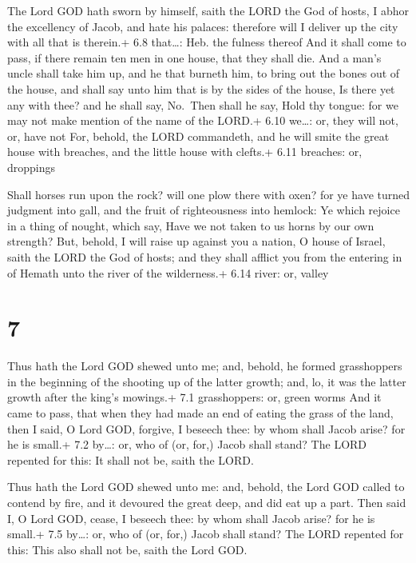  The Lord GOD hath sworn by himself, saith the LORD the God
of hosts, I abhor the excellency of Jacob, and hate his palaces:
therefore will I deliver up the city with all that is therein.+ 6.8
that\ldots: Heb. the fulness thereof  And it shall come to
pass, if there remain ten men in one house, that they shall die.
 And a man's uncle shall take him up, and he that burneth
him, to bring out the bones out of the house, and shall say unto him
that is by the sides of the house, Is there yet any with thee? and he
shall say, No.~Then shall he say, Hold thy tongue: for we may not make
mention of the name of the LORD.+ 6.10 we\ldots: or, they will not, or,
have not  For, behold, the LORD commandeth, and he will
smite the great house with breaches, and the little house with clefts.+
6.11 breaches: or, droppings

 Shall horses run upon the rock? will one plow there with
oxen? for ye have turned judgment into gall, and the fruit of
righteousness into hemlock:  Ye which rejoice in a thing of
nought, which say, Have we not taken to us horns by our own strength?
 But, behold, I will raise up against you a nation, O house
of Israel, saith the LORD the God of hosts; and they shall afflict you
from the entering in of Hemath unto the river of the wilderness.+ 6.14
river: or, valley

\hypertarget{section-6}{%
\section{7}\label{section-6}}

 Thus hath the Lord GOD shewed unto me; and, behold, he
formed grasshoppers in the beginning of the shooting up of the latter
growth; and, lo, it was the latter growth after the king's mowings.+ 7.1
grasshoppers: or, green worms  And it came to pass, that
when they had made an end of eating the grass of the land, then I said,
O Lord GOD, forgive, I beseech thee: by whom shall Jacob arise? for he
is small.+ 7.2 by\ldots: or, who of (or, for,) Jacob shall stand?
 The LORD repented for this: It shall not be, saith the
LORD.

 Thus hath the Lord GOD shewed unto me: and, behold, the
Lord GOD called to contend by fire, and it devoured the great deep, and
did eat up a part.  Then said I, O Lord GOD, cease, I
beseech thee: by whom shall Jacob arise? for he is small.+ 7.5 by\ldots:
or, who of (or, for,) Jacob shall stand?  The LORD repented
for this: This also shall not be, saith the Lord GOD.

